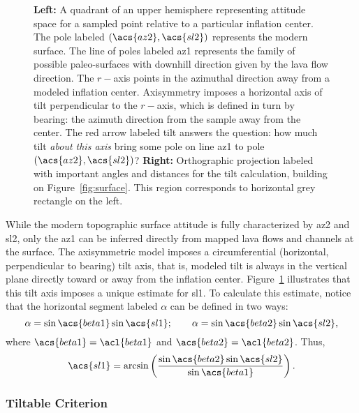 \begin{figure}
\begin{center}
    \caption[\Acl{tilt} from mapping]{\textbf{Left:} A quadrant of an upper hemisphere representing attitude space for a sampled point relative to a particular inflation center. The pole labeled $\left(\acs{az2},\acs{sl2}\right)$ represents the modern surface. The line of poles labeled \acs{az1} represents the family of possible paleo-surfaces with downhill direction given by the lava flow direction. The $r-$axis points in the azimuthal direction away from a modeled inflation center. Axisymmetry imposes a horizontal axis of tilt perpendicular to the $r-$axis, which is defined in turn by \acs{bearing}: the azimuth direction from the sample away from the center. The red arrow labeled \acs{tilt} answers the question: how much tilt \emph{about this axis} bring some pole on line \acs{az1} to pole $\left(\acs{az2},\acs{sl2}\right)$? \textbf{Right:} Orthographic projection labeled with important angles and distances for the tilt calculation, building on Figure~\ref{fig:surface}. This region corresponds to horizontal grey rectangle on the left.}%
    \label{fig:tilt-from-map}%
\end{center}
\end{figure}
While the modern topographic surface attitude is fully characterized by \acf{az2} and \acf{sl2}, only the \acf{az1} can be inferred directly from mapped lava flows and channels at the surface. The axisymmetric model imposes a circumferential (horizontal, perpendicular to \acs{bearing}) tilt axis, that is, modeled tilt is always in the vertical plane directly toward or away from the inflation center. Figure~\ref{fig:tilt-from-map} illustrates that this tilt axis imposes a unique estimate for \acf{sl1}. To calculate this estimate, notice that the horizontal segment labeled $\alpha$ can be defined in two ways:
\begin{equation*}
    \alpha = \sin\acs{beta1}\sin\acs{sl1};\qquad
    \alpha = \sin\acs{beta2}\sin\acs{sl2},
\end{equation*}
where $\acs{beta1} = \acl{beta1}$ and $\acs{beta2} = \acl{beta2}$. Thus,
\begin{equation}
    \acs{sl1} = \arcsin\left(\frac{\sin\acs{beta2}\sin\acs{sl2}}{\sin\acs{beta1}}\right).\label{eq:paleo-slope}
\end{equation}

\subsubsection{Tiltable Criterion}\label{sec:tiltable}

